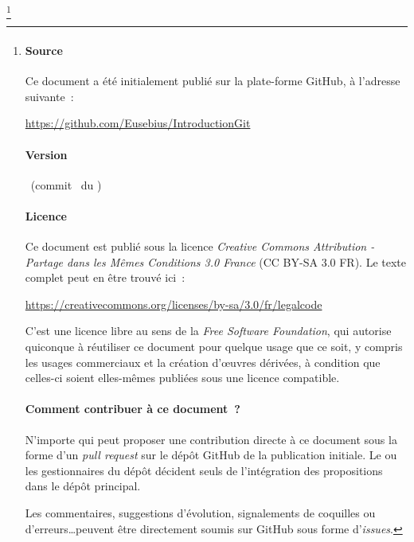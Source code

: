 \documentclass[a4paper,twoside,french]{book}
\begin{document}
\thanks{

  \par\vspace*{\fill}

  \paragraph*{Source}

  Ce document a été initialement publié sur la plate-forme GitHub, à
  l'adresse suivante~:
  \centerline{\url{https://github.com/Eusebius/IntroductionGit}}

  \paragraph*{Version}

  \currentVersion\
  (commit \gitAbbrevHash\ du \gitCommitterDate)
  
  \paragraph*{Licence}

  Ce document est publié sous la licence \textit{Creative Commons
    Attribution - Partage dans les Mêmes Conditions 3.0 France} (CC
  BY-SA 3.0 FR). Le texte complet peut en être trouvé ici~:
  \centerline{\url{https://creativecommons.org/licenses/by-sa/3.0/fr/legalcode}}

  C'est une licence libre au sens de la \textit{Free Software
    Foundation}, qui autorise quiconque à réutiliser ce document pour
  quelque usage que ce soit, y compris les usages commerciaux et la
  création d'\oe uvres dérivées, à condition que celles-ci soient
  elles-mêmes publiées sous une licence compatible.

  \paragraph*{Comment contribuer à ce document~?}

  N'importe qui peut proposer une contribution directe à ce document
  sous la forme d'un \textit{pull request} sur le dépôt GitHub de la
  publication initiale. Le ou les gestionnaires du dépôt décident
  seuls de l'intégration des propositions dans le dépôt principal.

  Les commentaires, suggestions d'évolution, signalements de coquilles
  ou d'erreurs\ldots peuvent être directement soumis sur GitHub sous
  forme d'\textit{issues}.

}
\end{document}
